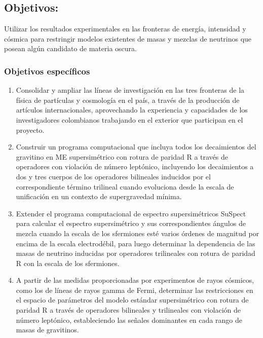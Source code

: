 \subsection{Objetivos:                                     }
Utilizar los resultados experimentales en las fronteras de energía,
intensidad y cósmica para restringir modelos existentes de masas y
mezclas de neutrinos que posean algún candidato de materia oscura.

\subsubsection{Objetivos específicos}
\label{sec:objet-espec}

\begin{enumerate}
\item Consolidar y ampliar las líneas de investigación en las tres
  fronteras de la física de partículas y cosmología en el país, a
  través de la producción de artículos internacionales, aprovechando la
  experiencia y capacidades de los investigadores colombianos
  trabajando en el exterior que participan en el proyecto.

\item \begin{gravitinodm}
  Construir un programa computacional que incluya todos los
  decaimientos del gravitino en ME supersimétrico con
  rotura de paridad R a través de operadores con violación de número
  leptónico, incluyendo los decaimientos a dos y tres cuerpos de los
  operadores bilineales inducidos por el correspondiente término
  trilineal cuando evoluciona desde la escala de unificación en un
  contexto de supergravedad mínima.
\end{gravitinodm}
\label{item:gravitinodm1}

\item 
\begin{gravitinodm}
  Extender el programa computacional de espectro supersimétricos
  SuSpect~\cite{Djouadi:2002ze} para calcular el espectro supersimétrico y sus
  correspondientes ángulos de mezcla cuando la escala de los
  sfermiones esté varios órdenes de magnitud por encima de la escala
  electrodébil, para luego determinar la dependencia de las masas
  de neutrino inducidas por operadores trilineales con rotura de
  paridad R con la escala de los sfermiones.
\end{gravitinodm}
\label{item:gravitinodm2}
\item 
\begin{gravitinodm}
  A partir de las medidas proporcionadas por experimentos de rayos cósmicos, como los
  de líneas de rayos gamma de Fermi, determinar las restricciones
  en el espacio de parámetros del modelo estándar supersimétrico con
  rotura de paridad R a través de operadores bilineales y trilineales
  con violación de número leptónico, estableciendo las señales
  dominantes en cada rango de masas de gravitinos.
\end{gravitinodm}


\end{enumerate}

